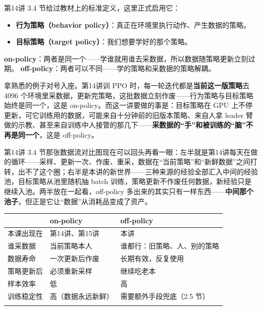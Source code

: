 \documentclass[
  chinese,
]{ctexart}
\providecommand{\tightlist}{%
  \setlength{\itemsep}{0pt}\setlength{\parskip}{0pt}}
\begin{document}
第14讲 3.4 节给过教材上的标准定义，这里正式启用它：

\begin{itemize}
\tightlist
\item
  \textbf{行为策略（behavior
  policy）}：真正在环境里执行动作、产生数据的策略。
\item
  \textbf{目标策略（target policy）}：我们想要学好的那个策略。
\end{itemize}

\textbf{on-policy}：两者是同一个------学谁就用谁去采数据，所以数据随策略更新立刻过期。
\textbf{off-policy}：两者可以不同------学的策略和采数据的策略解耦。

拿熟悉的例子对号入座。第14讲训 PPO
时，每一轮迭代都是\textbf{当前这一版策略}去 4096
个环境里采数据，更新完策略，这批数据立刻作废------行为策略与目标策略始终是同一个，这是
on-policy。而这一讲要做的事是：目标策略在 GPU
上不停更新，可它训练用的数据，可能来自十分钟前的旧版本策略、来自人拿
leader
臂做的示教、甚至来自训练中人接管的那几下------\textbf{采数据的``手''和被训练的``脑''不再是同一个}，这是
off-policy。

第14讲 3.4
节那张数据流对比图现在可以回头再看一眼：左半就是第14讲每天在做的循环------采样、更新一次、作废、重采，数据在``当前策略''和``新鲜数据''之间打转，出不了这个圈；右半是本讲的新世界------三种来源的经验全部汇入中间的经验池，目标策略从池里随机抽
batch
训练，策略更新不作废任何数据，新经验只是继续入池。两半放在一起看，off-policy
多出来的其实只有一样东西------\textbf{中间那个池子}，但正是它让``数据''从消耗品变成了资产。

\begin{center}
\begin{tabular}{@{}>{\raggedright\arraybackslash}p{} >{\raggedright\arraybackslash}p{} >{\raggedright\arraybackslash}p{}@{}}
\toprule\noalign{}
 & on-policy & off-policy \\
\midrule\noalign{}
本课出现在 & 第14讲、第15讲 & 本讲 \\
谁采数据 & 当前策略本人 & 谁都行：旧策略、人、别的策略 \\
数据寿命 & 一次更新后作废 & 长期有效，反复使用 \\
策略更新后 & 必须重新采样 & 继续吃老本 \\
样本效率 & 低 & 高 \\
训练稳定性 & 高（数据永远新鲜） & 需要额外手段兜底（2.5 节） \\
\bottomrule\noalign{}
\end{tabular}
\end{center}
\end{document}
